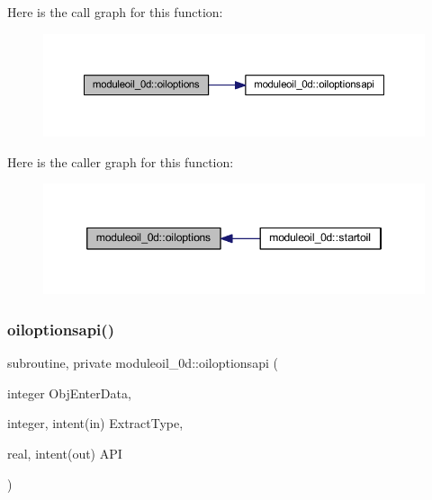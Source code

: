 Here is the call graph for this function\+:\nopagebreak
\begin{figure}[H]
\begin{center}
\leavevmode
\includegraphics[width=350pt]{namespacemoduleoil__0d_ae91c560ecac70b4b9f3ba4ca7f14edbe_cgraph}
\end{center}
\end{figure}
Here is the caller graph for this function\+:\nopagebreak
\begin{figure}[H]
\begin{center}
\leavevmode
\includegraphics[width=346pt]{namespacemoduleoil__0d_ae91c560ecac70b4b9f3ba4ca7f14edbe_icgraph}
\end{center}
\end{figure}
\mbox{\label{namespacemoduleoil__0d_aee1786140ad8f5a32f57df0b719d830b}} 
\subsubsection{\texorpdfstring{oiloptionsapi()}{oiloptionsapi()}}
{\footnotesize\ttfamily subroutine, private moduleoil\+\_\+0d\+::oiloptionsapi (\begin{DoxyParamCaption}\item[{integer}]{Obj\+Enter\+Data,  }\item[{integer, intent(in)}]{Extract\+Type,  }\item[{real, intent(out)}]{A\+PI }\end{DoxyParamCaption})\hspace{0.3cm}{\ttfamily [private]}}

